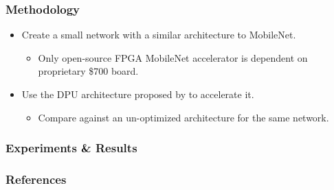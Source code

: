 \documentclass[english]{beamer}
\begin{document}
\begin{frame}
\frametitle{Methodology}
\begin{itemize}
	\item Create a small network with a similar architecture to MobileNet.
	\begin{itemize}
		\item Only open-source FPGA MobileNet
		accelerator\supercite{solovyev2019mobilenet} is dependent on
		proprietary \$700 board.
	\end{itemize}
	\item Use the DPU architecture proposed by
	\citeauthor{mobilenet2019fpga}\supercite{mobilenet2019fpga}
	to accelerate it.
	\begin{itemize}
		\item Compare against an un-optimized architecture for the same network.
	\end{itemize}
\end{itemize}
\end{frame}


\begin{frame}
\frametitle{Experiments \& Results}
\end{frame}


\begin{frame}
\frametitle{References}
\printbibliography
\end{frame}
\end{document}
